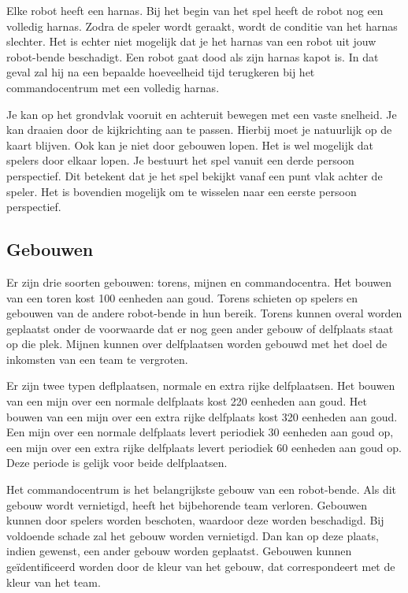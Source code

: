     Elke robot heeft een harnas. Bij het begin van het spel heeft de robot nog een volledig harnas. Zodra de speler wordt geraakt, wordt de conditie van het harnas slechter. Het is echter niet mogelijk dat je het harnas van een robot uit jouw robot-bende beschadigt. Een robot gaat dood als zijn harnas kapot is. In dat geval zal hij na een bepaalde hoeveelheid tijd terugkeren bij het commandocentrum met een volledig harnas.
    
    Je kan op het grondvlak vooruit en achteruit bewegen met een vaste snelheid. Je kan draaien door de kijkrichting aan te passen. Hierbij moet je natuurlijk op de kaart blijven. Ook kan je niet door gebouwen lopen. Het is wel mogelijk dat spelers door elkaar lopen. Je bestuurt het spel vanuit een derde persoon perspectief. Dit betekent dat je het spel bekijkt vanaf een punt vlak achter de speler. Het is bovendien mogelijk om te wisselen naar een eerste persoon perspectief.

    \subsection{Gebouwen}
    Er zijn drie soorten gebouwen: torens, mijnen en commandocentra. Het bouwen van een toren kost 100 eenheden aan goud. Torens schieten op spelers en gebouwen van de andere robot-bende in hun bereik. Torens kunnen overal worden geplaatst onder de voorwaarde dat er nog geen ander gebouw of delfplaats staat op die plek. Mijnen kunnen over delfplaatsen worden gebouwd met het doel de inkomsten van een team te vergroten. 
    
    Er zijn twee typen deflplaatsen, normale en extra rijke delfplaatsen. Het bouwen van een mijn over een normale delfplaats kost 220 eenheden aan goud. Het bouwen van een mijn over een extra rijke delfplaats kost 320 eenheden aan goud. Een mijn over een normale delfplaats levert periodiek 30 eenheden aan goud op, een mijn over een extra rijke delfplaats levert periodiek 60 eenheden aan goud op. Deze periode is gelijk voor beide delfplaatsen.
    
    Het commandocentrum is het belangrijkste gebouw van een robot-bende. Als dit gebouw wordt vernietigd, heeft het bijbehorende team verloren. Gebouwen kunnen door spelers worden beschoten, waardoor deze worden beschadigd. Bij voldoende schade zal het gebouw worden vernietigd. Dan kan op deze plaats, indien gewenst, een ander gebouw worden geplaatst. Gebouwen kunnen ge\"identificeerd worden door de kleur van het gebouw, dat correspondeert met de kleur van het team.

